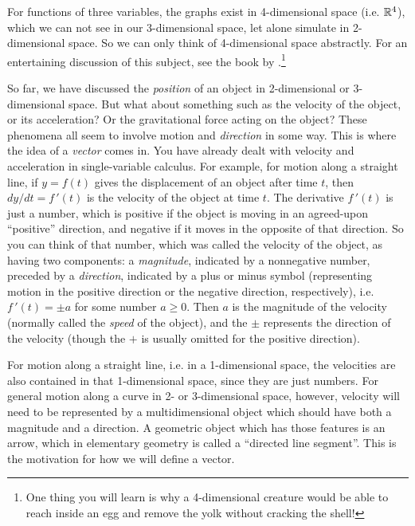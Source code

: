 For functions of three variables, the graphs exist in 4-dimensional space (i.e. $\mathbb{R}^{4}$),
which we can not see in our 3-dimensional space, let alone simulate in 2-dimensional space.  So we
can only think of 4-dimensional space abstractly.  For an entertaining discussion of this subject, see the book by
\cite{abb}.\footnote{One thing you will learn is why a 4-dimensional creature would be able to reach inside an egg and
remove the yolk without cracking the shell!}

So far, we have discussed the \emph{position} of an object in 2-dimensional or 3-dimensional space.
But what about something such as the velocity of the object, or its acceleration?
Or the gravitational force acting on the object? These phenomena all seem to involve motion and \emph{direction} in some
way.  This is where the idea of a \emph{vector} comes in.
\newpage
You have already dealt with velocity and acceleration in single-variable calculus.  For example, for motion along a
straight line, if $y = f(t)$ gives the displacement of an object after time $t$, then $dy/dt = f\,'(t)$ is the velocity
of the object at time $t$.  The derivative
$f\,'(t)$ is just a number, which is positive if the object is moving in an
agreed-upon ``positive'' direction, and negative if it moves in the opposite of that direction. So you can think of
that number, which was called the velocity of the object, as having two components: a \emph{magnitude}, indicated by
a nonnegative number, preceded by a \emph{direction}, indicated by a plus or minus symbol (representing motion in the
positive direction or the negative direction, respectively), i.e. $f\,'(t) = \pm a$ for some number $a \ge 0$.  Then
$a$ is the magnitude of the velocity (normally called the \emph{speed} of the object), and the $\pm$ represents the
direction of the velocity (though the $+$ is usually omitted for the positive direction).

For motion along a straight line, i.e. in a 1-dimensional space, the velocities are also contained in that
1-dimensional space, since they are just numbers.  For general motion along a curve in 2- or 3-dimensional space,
however, velocity will need to be represented by a multidimensional object which should have both a magnitude and a
direction.  A geometric object which has those features is an arrow, which in elementary geometry is called a
``directed line segment''.  This is the motivation for how we will define a vector.


